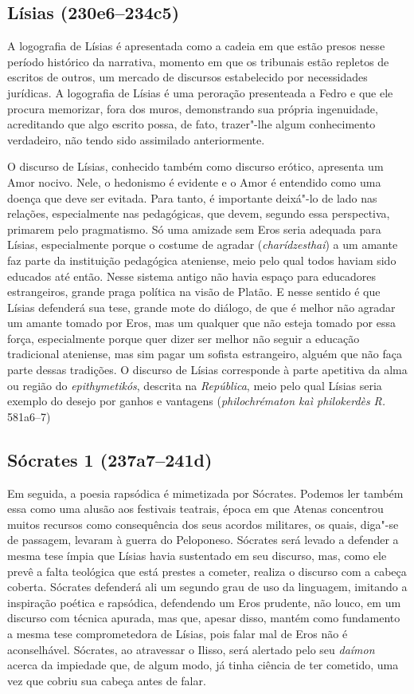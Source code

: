 \subsection{\textbf{Lísias} (230e6--234c5)} 


A logografia de Lísias é apresentada
como a cadeia em que estão presos nesse período histórico da narrativa,
momento em que os tribunais estão repletos de escritos de outros, um
mercado de discursos estabelecido por necessidades jurídicas. A logografia de Lísias é uma peroração presenteada a Fedro e que ele
procura memorizar, fora dos muros, demonstrando sua própria ingenuidade,
acreditando que algo escrito possa, de fato, trazer"-lhe algum
conhecimento verdadeiro, não tendo sido assimilado anteriormente.


O discurso de Lísias, conhecido também como discurso erótico, apresenta
um Amor nocivo. Nele, o hedonismo é evidente e o Amor é entendido como
uma doença que deve ser evitada. Para tanto, é importante deixá"-lo de
lado nas relações, especialmente nas pedagógicas, que devem, segundo
essa perspectiva, primarem pelo pragmatismo. Só uma amizade sem Eros
seria adequada para Lísias, especialmente porque o costume de agradar
(\emph{charídzesthai}) a um amante faz parte da instituição pedagógica
ateniense, meio pelo qual todos haviam sido educados até então. Nesse
sistema antigo não havia espaço para educadores estrangeiros, grande
praga política na visão de Platão. E nesse sentido é que Lísias
defenderá sua tese, grande mote do diálogo, de que é melhor não agradar
um amante tomado por Eros, mas um qualquer que não esteja tomado por
essa força, especialmente porque quer dizer ser melhor não seguir a
educação tradicional ateniense, mas sim pagar um sofista estrangeiro,
alguém que não faça parte dessas tradições. O discurso de Lísias
corresponde à parte apetitiva da alma ou região do \emph{epithymetikós},
descrita na \emph{República}, meio pelo qual Lísias seria exemplo do
desejo por ganhos e vantagens (\emph{philochrématon kaì
philokerdès} \emph{R.} 581a6--7)


\subsection{Sócrates 1 (237a7--241d)} 

Em seguida, a poesia rapsódica é
mimetizada por Sócrates. Podemos ler também essa como uma alusão aos
festivais teatrais, época em que Atenas concentrou muitos recursos como
consequência dos seus acordos militares, os quais, diga"-se de passagem,
levaram à guerra do Peloponeso. Sócrates será levado a defender a mesma
tese ímpia que Lísias havia sustentado em seu discurso, mas, como ele
prevê a falta teológica que está prestes a cometer, realiza o discurso
com a cabeça coberta. Sócrates defenderá ali um segundo grau de uso da
linguagem, imitando a inspiração poética e rapsódica, defendendo um Eros
prudente, não louco, em um discurso com técnica apurada, mas que, apesar
disso, mantém como fundamento a mesma tese comprometedora de Lísias,
pois falar mal de Eros não é aconselhável. Sócrates, ao atravessar o
Ilisso, será alertado pelo seu \emph{daímon} acerca da impiedade que, de
algum modo, já tinha ciência de ter cometido, uma vez que cobriu sua
cabeça antes de falar.

